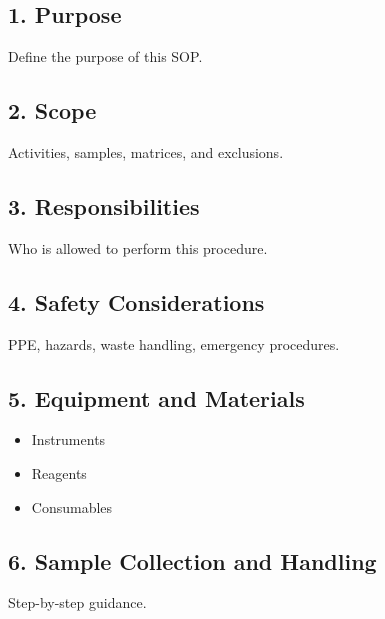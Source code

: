\documentclass[
]{lab-sop}
\author{}
\date{\vspace{-2.5em}}
\providecommand{\tightlist}{%
  \setlength{\itemsep}{0pt}\setlength{\parskip}{0pt}}
\begin{document}
\maketitle

\subsection{1. Purpose}\label{purpose}

Define the purpose of this SOP.

\subsection{2. Scope}\label{scope}

Activities, samples, matrices, and exclusions.

\subsection{3. Responsibilities}\label{responsibilities}

Who is allowed to perform this procedure.

\subsection{4. Safety Considerations}\label{safety-considerations}

\begin{safetybox}
PPE, hazards, waste handling, emergency procedures.
\end{safetybox}

\subsection{5. Equipment and Materials}\label{equipment-and-materials}

\begin{itemize}
\tightlist
\item
  Instruments
\item
  Reagents
\item
  Consumables
\end{itemize}

\subsection{6. Sample Collection and
Handling}\label{sample-collection-and-handling}

Step-by-step guidance.
\end{document}

